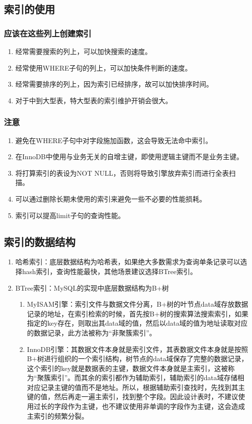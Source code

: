 \documentclass[main.tex]{subfiles}
\begin{document}
\subsection{索引的使用}
\subsubsection{应该在这些列上创建索引}
\begin{enumerate}
    \item 经常需要搜索的列上，可以加快搜索的速度。
    \item 经常使用WHERE子句的列上，可以加快条件判断的速度。
    \item 经常需要排序的列上，因为索引已经排序，故可以加快排序时间。
    \item 对于中到大型表，特大型表的索引维护开销会很大。
\end{enumerate}
\subsubsection{注意}
\begin{enumerate}
    \item 避免在WHERE子句中对字段施加函数，这会导致无法命中索引。
    \item 在InnoDB中使用与业务无关的自增主键，即使用逻辑主键而不是业务主键。
    \item 将打算索引的表设为NOT NULL，否则将导致引擎放弃索引而进行全表扫描。
    \item 可以通过删除长期未使用的索引来避免一些不必要的性能损耗。
    \item 索引可以提高limit子句的查询性能。
\end{enumerate}

\subsection{索引的数据结构}
\begin{enumerate}
    \item 哈希索引：底层数据结构为哈希表，如果绝大多数需求为查询单条记录可以选择hash索引，查询性能最快，其他场景建议选择BTree索引。
    \item BTree索引：MySQL的实现中底层数据结构为B+树
        \begin{enumerate}
            \item MyISAM引擎：索引文件与数据文件分离，B+树的叶节点data域存放数据记录的地址，在索引检索的时候，首先按B+树的搜索算法搜索索引，如果指定的key存在，则取出其data域的值，然后以data域的值为地址读取对应的数据记录，此方法被称为“非聚簇索引”。
            \item InnoDB引擎：其数据文件本身就是索引文件，其表数据文件本身就是按照B+树进行组织的一个索引结构，树节点的data域保存了完整的数据记录，这个索引的key就是数据表的主键，数据文件本身就是主索引，这被称为“聚簇索引”。而其余的索引都作为辅助索引，辅助索引的data域存储相对应记录主键的值而不是地址。所以，根据辅助索引查找时，先找到其主键的值，然后再走一遍主索引，找到整个字段。因此设计表时，不建议使用过长的字段作为主键，也不建议使用非单调的字段作为主键，这会造成主索引的频繁分裂。
        \end{enumerate}
\end{enumerate}
\end{document}
